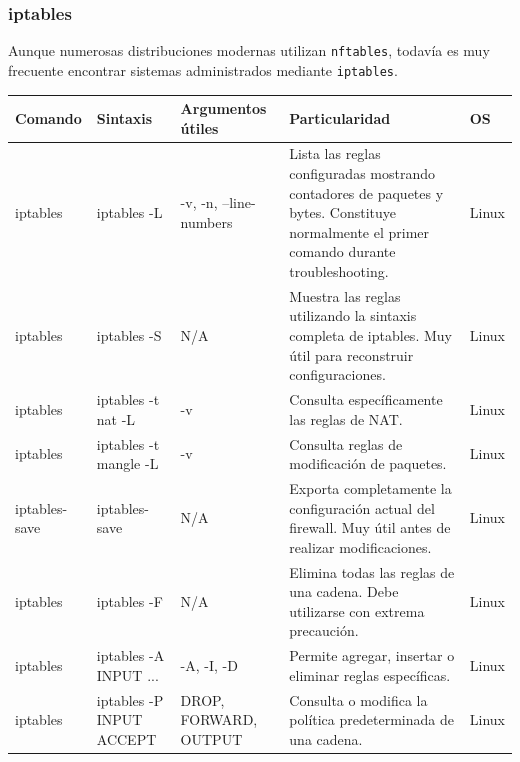 \documentclass[a4paper,10pt]{article}
\begin{document}

\subsubsection{iptables}

Aunque numerosas distribuciones modernas utilizan \texttt{nftables}, todavía
es muy frecuente encontrar sistemas administrados mediante \texttt{iptables}.

\begin{longtable}{|p{2.8cm}|p{3cm}|p{4cm}|p{5.6cm}|p{1.5cm}|}

\hline
Comando &
Sintaxis &
Argumentos útiles &
Particularidad &
OS
\\
\hline
\endhead

iptables &
iptables -L &
-v, -n, --line-numbers &
Lista las reglas configuradas mostrando contadores de paquetes y bytes. Constituye normalmente el primer comando durante troubleshooting. &
Linux
\\
\hline

iptables &
iptables -S &
N/A &
Muestra las reglas utilizando la sintaxis completa de iptables. Muy útil para reconstruir configuraciones. &
Linux
\\
\hline

iptables &
iptables -t nat -L &
-v &
Consulta específicamente las reglas de NAT. &
Linux
\\
\hline

iptables &
iptables -t mangle -L &
-v &
Consulta reglas de modificación de paquetes. &
Linux
\\
\hline

iptables-save &
iptables-save &
N/A &
Exporta completamente la configuración actual del firewall. Muy útil antes de realizar modificaciones. &
Linux
\\
\hline

iptables &
iptables -F &
N/A &
Elimina todas las reglas de una cadena. Debe utilizarse con extrema precaución. &
Linux
\\
\hline

iptables &
iptables -A INPUT ... &
-A, -I, -D &
Permite agregar, insertar o eliminar reglas específicas. &
Linux
\\
\hline

iptables &
iptables -P INPUT ACCEPT &
DROP, FORWARD, OUTPUT &
Consulta o modifica la política predeterminada de una cadena. &
Linux
\\
\hline

\end{longtable}
\end{document}
